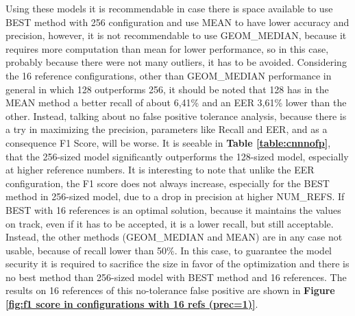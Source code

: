 Using these models it is recommendable in case there is space available to use BEST method with 256 configuration and use MEAN to have lower accuracy and precision, however, it is not recommendable to use GEOM\_MEDIAN, because it requires more computation than mean for lower performance, so in this case, probably because there were not many outliers, it has to be avoided. Considering the 16 reference configurations, other than GEOM\_MEDIAN performance in general in which 128 outperforms 256, it should be noted that 128 has in the MEAN method a better recall of about 6,41\% and an EER 3,61\% lower than the other. Instead, talking about no false positive tolerance analysis, because there is a try in maximizing the precision, parameters like Recall and EER, and as a consequence F1 Score, will be worse. It is seeable in \textbf{Table \ref{table:cnnnofp}}, that the 256-sized model significantly outperforms the 128-sized model, especially at higher reference numbers. It is interesting to note that unlike the EER configuration, the F1 score does not always increase, especially for the BEST method in 256-sized model, due to a drop in precision at higher NUM\_REFS. If BEST with 16 references is an optimal solution, because it maintains the values on track, even if it has to be accepted, it is a lower recall, but still acceptable. Instead, the other methods (GEOM\_MEDIAN and MEAN) are in any case not usable, because of recall lower than 50\%. In this case, to guarantee the model security it is required to sacrifice the size in favor of the optimization and there is no best method than 256-sized model with BEST method and 16 references. The results on 16 references of this no-tolerance false positive are shown in \textbf{Figure \ref{fig:f1 score in configurations with 16 refs (prec=1)}}.
